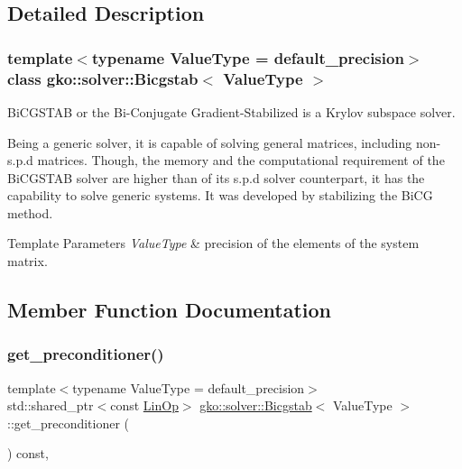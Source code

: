\subsection{Detailed Description}
\subsubsection*{template$<$typename Value\+Type = default\+\_\+precision$>$\newline
class gko\+::solver\+::\+Bicgstab$<$ Value\+Type $>$}

Bi\+C\+G\+S\+T\+AB or the Bi-\/\+Conjugate Gradient-\/\+Stabilized is a Krylov subspace solver. 

Being a generic solver, it is capable of solving general matrices, including non-\/s.\+p.\+d matrices. Though, the memory and the computational requirement of the Bi\+C\+G\+S\+T\+AB solver are higher than of its s.\+p.\+d solver counterpart, it has the capability to solve generic systems. It was developed by stabilizing the Bi\+CG method.


\begin{DoxyTemplParams}{Template Parameters}
{\em Value\+Type} & precision of the elements of the system matrix. \\
\hline
\end{DoxyTemplParams}


\subsection{Member Function Documentation}
\mbox{\label{classgko_1_1solver_1_1Bicgstab_ac16d32672fbc91d8cfd7c0607c9771db}} 
\subsubsection{\texorpdfstring{get\+\_\+preconditioner()}{get\_preconditioner()}}
{\footnotesize\ttfamily template$<$typename Value\+Type  = default\+\_\+precision$>$ \\
std\+::shared\+\_\+ptr$<$const \hyperlink{classgko_1_1LinOp}{Lin\+Op}$>$ \hyperlink{classgko_1_1solver_1_1Bicgstab}{gko\+::solver\+::\+Bicgstab}$<$ Value\+Type $>$\+::get\+\_\+preconditioner (\begin{DoxyParamCaption}{ }\end{DoxyParamCaption}) const\hspace{0.3cm}{\ttfamily [override]}, {\ttfamily [virtual]}}



